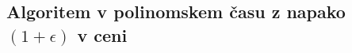 \documentclass{article}
\begin{document}
 





\subsection*{Algoritem v polinomskem času z napako $(1+\epsilon)$ v ceni}
\end{document}
